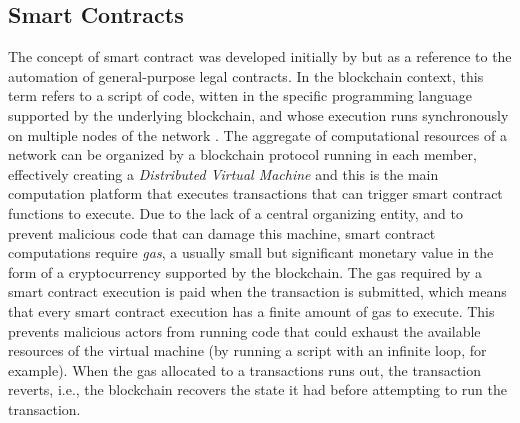 \documentclass[../main.tex]{subfiles}
\begin{document}
\subsection{Smart Contracts}
The concept of smart contract was developed initially by \cite{Szabo1997} but as a reference to the automation of general-purpose legal contracts. In the blockchain context, this term refers to a script of code, witten in the specific programming language supported by the underlying blockchain, and whose execution runs synchronously on multiple nodes of the network \cite{Zou2021}. The aggregate of computational resources of a network can be organized by a blockchain protocol running in each member, effectively creating a \textit{Distributed Virtual Machine} and this is the main computation platform that executes transactions that can trigger smart contract functions to execute. Due to the lack of a central organizing entity, and to prevent malicious code that can damage this machine, smart contract computations require \textit{gas}, a usually small but significant monetary value in the form of a cryptocurrency supported by the blockchain. The gas required by a smart contract execution is paid when the transaction is submitted, which means that every smart contract execution has a finite amount of gas to execute. This prevents malicious actors from running code that could exhaust the available resources of the virtual machine (by running a script with an infinite loop, for example). When the gas allocated to a transactions runs out, the transaction reverts, i.e., the blockchain recovers the state it had before attempting to run the transaction.
\end{document}
